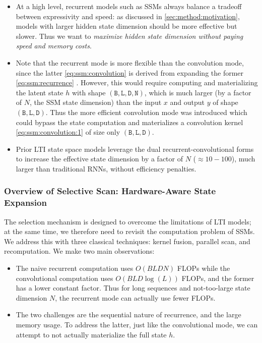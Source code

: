 \begin{itemize}[leftmargin=*,itemsep=0pt]
  \item At a high level, recurrent models such as SSMs always balance a tradeoff between expressivity and speed: as discussed in \ref{sec:method:motivation}, models with larger hidden state dimension should be more effective but slower. Thus we want to \emph{maximize hidden state dimension without paying speed and memory costs}.

  \item Note that the recurrent mode is more flexible than the convolution mode, since the latter \eqref{eq:ssm:convolution} is derived from expanding the former \eqref{eq:ssm:recurrence} \citep{gu2021combining,gu2022efficiently}.
  However, this would require computing and materializing the latent state $h$ with shape $\mathtt{(B,L,D,N)}$, which is much larger (by a factor of $N$, the SSM state dimension) than the input $x$ and output $y$ of shape $\mathtt{(B,L,D)}$.
  Thus the more efficient convolution mode was introduced which could bypass the state computation and materializes a convolution kernel \eqref{eq:ssm:convolution:1} of size only $\mathtt{(B,L,D)}$.

\item Prior LTI state space models leverage the dual recurrent-convolutional forms to increase the effective state dimension by a factor of $N$ ($\approx 10-100$), much larger than traditional RNNs, without efficiency penalties.
\end{itemize}

\subsubsection{Overview of Selective Scan: Hardware-Aware State Expansion}

The selection mechanism is designed to overcome the limitations of LTI models; at the same time, we therefore need to revisit the computation problem of SSMs. We address this with three classical techniques: kernel fusion, parallel scan, and recomputation. We make two main observations:

\begin{itemize}[leftmargin=*,itemsep=0pt,topsep=0pt]
\item The naive recurrent computation uses $O(BLDN)$ FLOPs while the convolutional computation uses $O(BLD\log(L))$ FLOPs, and the former has a lower constant factor. Thus for long sequences and not-too-large state dimension $N$, the recurrent mode can actually use fewer FLOPs.
\item The two challenges are the sequential nature of recurrence, and the large memory usage. To address the latter, just like the convolutional mode, we can attempt to not actually materialize the full state $h$.
\end{itemize}

